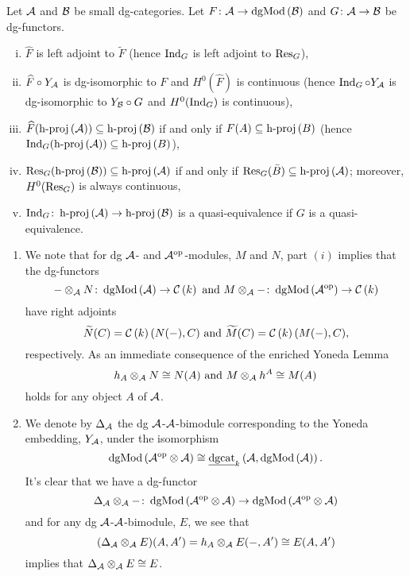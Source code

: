 \begin{proposition}[{\cite[Prop 3.2]{CS15}}]
  Let \(\A\) and \(\B\) be small dg-categories.
  Let \(F \colon \A \to \dgMod{\B}\) and \(G \colon \A \to \B\) be dg-functors.
  \begin{enumerate}[(i)]
  \item
    \(\widehat{F}\) is left adjoint to \(\widetilde{F}\) (hence \(\Ind{G}\) is left adjoint to \(\Res{G}\)),
  \item
    \(\widehat{F} \circ Y_\A\) is dg-isomorphic to \(F\) and \(H^0(\widehat{F})\) is continuous (hence \(\Ind{G} \circ Y_\A\) is dg-isomorphic to \(Y_\B \circ G\) and \(H^0(\Ind{G})\) is continuous),
  \item
    \(\widehat{F}(\hproj{\A}) \subseteq \hproj{\B}\) if and only if \(F(A) \subseteq \hproj{B}\) (hence \(\Ind{G}(\hproj{\A}) \subseteq \hproj{B}\)),
  \item
    \(\Res{G}(\hproj{\B}) \subseteq \hproj{\A}\) if and only if \(\Res{G}(\bar{B}) \subseteq \hproj{\A}\); moreover,\\ \(H^0(\Res{G})\) is always continuous,
  \item
    \(\Ind{G} \colon \hproj{\A} \to \hproj{\B}\) is a quasi-equivalence if \(G\) is a quasi-equivalence.
  \end{enumerate}
\end{proposition}

\begin{remark}\label{rem: tensoring with reps}
  \begin{enumerate}
  \item
    We note that for dg \(\A\)- and \(\A^\opp\)-modules, \(M\) and \(N\), part \((i)\) implies that the dg-functors
    \[- \otimes_\A N \colon \dgMod{\A} \to \CH{k}\ \text{and}\ M \otimes_\A - \colon \dgMod{\A^\opp} \to \CH{k}\]
    have right adjoints
    \[\widetilde{N}(C) = \CH{k}(N( - ), C)\ \text{and}\ \widetilde{M}(C) = \CH{k}(M( - ), C),\]
    respectively.
    As an immediate consequence of the enriched Yoneda Lemma
    \[h_A \otimes_\A N \cong N(A)\ \text{and}\ M \otimes_\A h^A \cong M(A)\]
    holds for any object \(A\) of \(\A\).
  \item
    We denote by \(\Delta_\A\) the dg \(\A\)-\(\A\)-bimodule corresponding to the Yoneda embedding, \(Y_\A\), under the isomorphism
    \[\dgMod{\A^\opp \otimes \A} \cong \DGCAT{k}\left(\A, \dgMod{\A}\right).\]
    It's clear that we have a dg-functor
    \[\Delta_\A \otimes_\A - \colon \dgMod{\A^\opp \otimes \A} \to \dgMod{\A^\opp \otimes \A}\]
    and for any dg \(\A\)-\(\A\)-bimodule, \(E\), we see that
    \[(\Delta_\A \otimes_\A E)(A,A^\prime) = h_A \otimes_\A E(- , A^\prime) \cong E(A,A^\prime)\]
    implies that \(\Delta_\A \otimes_\A E \cong E\).
  \end{enumerate}
\end{remark}

